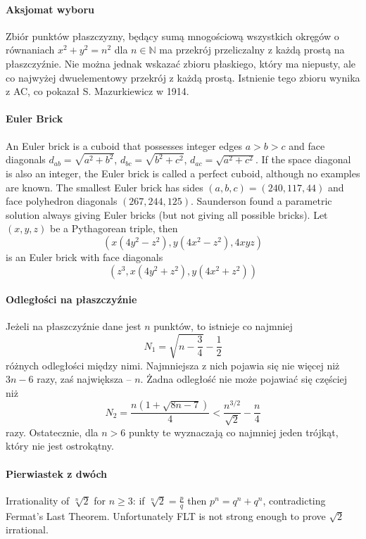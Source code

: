 \begin{parnumbers}
\paragraph{Aksjomat wyboru} Zbiór punktów płaszczyzny, będący sumą mnogościową wszystkich okręgów o równaniach $x^2 + y^2 = n^2$ dla $n \in \mathbb{N}$ ma przekrój przeliczalny z każdą prostą na płaszczyźnie. Nie można jednak wskazać zbioru płaskiego, który ma niepusty, ale co najwyżej dwuelementowy przekrój z każdą prostą. Istnienie tego zbioru wynika z AC, co pokazał S. Mazurkiewicz w 1914.

\paragraph{Euler Brick} An Euler brick is a cuboid that possesses integer edges $a>b>c$ and face diagonals $d_{ab} = \sqrt{a^2+b^2}$, $d_{bc} = \sqrt{b^2+c^2}$, $d_{ac} = \sqrt{a^2+c^2}$. If the space diagonal is also an integer, the Euler brick is called a perfect cuboid, although no examples are known. The smallest Euler brick has sides $(a,b,c) = (240,117,44)$ and face polyhedron diagonals $(267, 244, 125)$. Saunderson found a parametric solution always giving Euler bricks (but not giving all possible bricks). Let $(x,y,z)$ be a Pythagorean triple, then $$\left(x\left(4y^2-z^2\right),y\left(4x^2-z^2\right),4xyz\right)$$ is an Euler brick with face diagonals $$\left(z^3,x\left(4y^2+z^2\right),y\left(4x^2+z^2\right)\right)$$

\paragraph{Odległości na płaszczyźnie} Jeżeli na płaszczyźnie dane jest $n$ punktów, to istnieje co najmniej $$N_1 = \sqrt{n-\frac{3}{4}} - \frac{1}{2}$$ różnych odległości między nimi. Najmniejsza z nich pojawia się nie więcej niż $3n-6$ razy, zaś największa -- $n$. Żadna odległość nie może pojawiać się częściej niż $$N_2 = \frac{n\left(1+\sqrt{8n-7}\right)}{4} < \frac{n^{3/2}}{\sqrt{2}} - \frac{n}{4}$$ razy. Ostatecznie, dla $n>6$ punkty te wyznaczają co najmniej jeden trójkąt, który nie jest ostrokątny. %

\paragraph{Pierwiastek z dwóch} Irrationality of $\sqrt[n]{2}$ for $n \geq 3$: if $\sqrt[n]{2} = \frac{p}{q}$ then $p^n=q^n + q^n$, contradicting Fermat's Last Theorem. Unfortunately FLT is not strong enough to prove $\sqrt{2}$ irrational.


\end{parnumbers}
